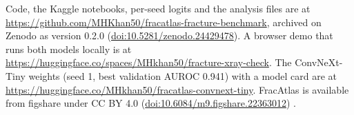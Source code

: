 \documentclass[11pt,a4paper]{article}
\begin{document}
Code, the Kaggle notebooks, per-seed logits and the analysis files are at
\url{https://github.com/MHKhan50/fracatlas-fracture-benchmark}, archived on Zenodo as version 0.2.0
(\href{https://doi.org/10.5281/zenodo.24429478}{doi:10.5281/zenodo.24429478}). A browser demo that runs both models
locally is at \url{https://huggingface.co/spaces/MHkhan50/fracture-xray-check}. The ConvNeXt-Tiny weights (seed 1, best validation
AUROC 0.941) with a model card are at \url{https://huggingface.co/MHkhan50/fracatlas-convnext-tiny}. FracAtlas is
available from figshare under CC BY 4.0 (\href{https://doi.org/10.6084/m9.figshare.22363012}{doi:10.6084/m9.figshare.22363012})
\citep{abedeen2023fracatlas}.



\end{document}
